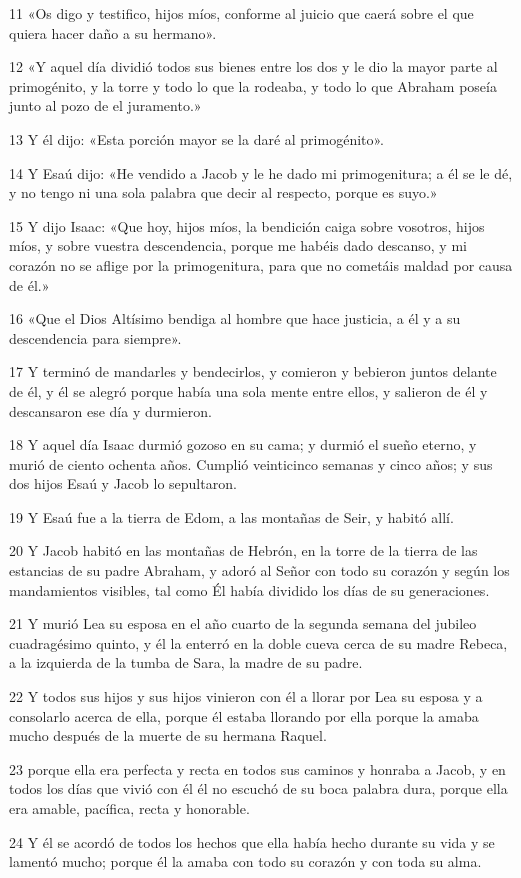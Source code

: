 \par 11 «Os digo y testifico, hijos míos, conforme al juicio que caerá sobre el que quiera hacer daño a su hermano».
\par 12 «Y aquel día dividió todos sus bienes entre los dos y le dio la mayor parte al primogénito, y la torre y todo lo que la rodeaba, y todo lo que Abraham poseía junto al pozo de el juramento.»
\par 13 Y él dijo: «Esta porción mayor se la daré al primogénito».
\par 14 Y Esaú dijo: «He vendido a Jacob y le he dado mi primogenitura; a él se le dé, y no tengo ni una sola palabra que decir al respecto, porque es suyo.»
\par 15 Y dijo Isaac: «Que hoy, hijos míos, la bendición caiga sobre vosotros, hijos míos, y sobre vuestra descendencia, porque me habéis dado descanso, y mi corazón no se aflige por la primogenitura, para que no cometáis maldad por causa de él.»
\par 16 «Que el Dios Altísimo bendiga al hombre que hace justicia, a él y a su descendencia para siempre».
\par 17 Y terminó de mandarles y bendecirlos, y comieron y bebieron juntos delante de él, y él se alegró porque había una sola mente entre ellos, y salieron de él y descansaron ese día y durmieron.
\par 18 Y aquel día Isaac durmió gozoso en su cama; y durmió el sueño eterno, y murió de ciento ochenta años. Cumplió veinticinco semanas y cinco años; y sus dos hijos Esaú y Jacob lo sepultaron.
\par 19 Y Esaú fue a la tierra de Edom, a las montañas de Seir, y habitó allí.
\par 20 Y Jacob habitó en las montañas de Hebrón, en la torre de la tierra de las estancias de su padre Abraham, y adoró al Señor con todo su corazón y según los mandamientos visibles, tal como Él había dividido los días de su generaciones.
\par 21 Y murió Lea su esposa en el año cuarto de la segunda semana del jubileo cuadragésimo quinto, y él la enterró en la doble cueva cerca de su madre Rebeca, a la izquierda de la tumba de Sara, la madre de su padre. 
\par 22 Y todos sus hijos y sus hijos vinieron con él a llorar por Lea su esposa y a consolarlo acerca de ella, porque él estaba llorando por ella porque la amaba mucho después de la muerte de su hermana Raquel.
\par 23 porque ella era perfecta y recta en todos sus caminos y honraba a Jacob, y en todos los días que vivió con él él no escuchó de su boca palabra dura, porque ella era amable, pacífica, recta y honorable.
\par 24 Y él se acordó de todos los hechos que ella había hecho durante su vida y se lamentó mucho; porque él la amaba con todo su corazón y con toda su alma.

